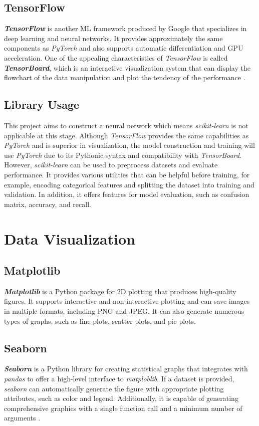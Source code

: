 \documentclass[12pt,twoside]{report}
\begin{document}
\subsection{TensorFlow}
\textit{\textbf{TensorFlow}} is another ML framework produced by Google that specializes in deep learning and neural networks. It provides approximately the same components as \textit{PyTorch} and also supports automatic differentiation and GPU acceleration. One of the appealing characteristics of \textit{TensorFlow} is called \textit{\textbf{TensorBoard}}, which is an interactive visualization system that can display the flowchart of the data manipulation and plot the tendency of the performance \citep{RN15}. 

\subsection{Library Usage}
This project aims to construct a neural network which means \textit{scikit-learn} is not applicable at this stage. Although \textit{TensorFlow} provides the same capabilities as \textit{PyTorch} and is superior in visualization, the model construction and training will use \textit{PyTorch} due to its Pythonic syntax and compatibility with \textit{TensorBoard}. 
\\

However, \textit{scikit-learn} can be used to preprocess datasets and evaluate performance. It provides various utilities that can be helpful before training, for example, encoding categorical features and splitting the dataset into training and validation. In addition, it offers features for model evaluation, such as confusion matrix, accuracy, and recall. 

\section{Data Visualization}
\subsection{Matplotlib}
\textbf{\textit{Matplotlib}} is a Python package for 2D plotting that produces high-quality figures. It supports interactive and non-interactive plotting and can save images in multiple formats, including PNG and JPEG. It can also generate numerous types of graphs, such as line plots, scatter plots, and pie plots.

\subsection{Seaborn}
\textbf{\textit{Seaborn}} is a Python library for creating statistical graphs that integrates with \textit{pandas} to offer a high-level interface to \textit{matploblib}. If a dataset is provided, \textit{seaborn} can automatically generate the figure with appropriate plotting attributes, such as color and legend. Additionally, it is capable of generating comprehensive graphics with a single function call and a minimum number of arguments \citep{RN16}.
\end{document}
